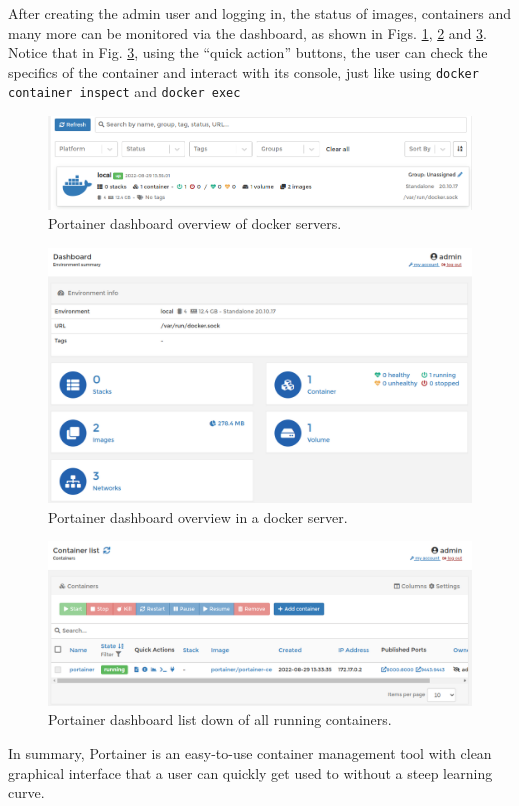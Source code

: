 After creating the admin user and logging in, the status of images, containers and many more can be monitored via the dashboard, as shown in Figs. \ref{ch:vac:fig:portainerdashboard1}, \ref{ch:vac:fig:portainerdashboard2} and \ref{ch:vac:fig:portainerdashboard3}. Notice that in Fig. \ref{ch:vac:fig:portainerdashboard3}, using the ``quick action'' buttons, the user can check the specifics of the container and interact with its console, just like using \verb|docker container inspect| and \verb|docker exec|
\begin{figure}[htbp]
	\centering
	\includegraphics[width=350pt]{chapters/part-3/figures/portainerdashboard1.png}
	\caption{Portainer dashboard overview of docker servers.} \label{ch:vac:fig:portainerdashboard1}
\end{figure}

\begin{figure}[htbp]
	\centering
	\includegraphics[width=350pt]{chapters/part-3/figures/portainerdashboard2.png}
	\caption{Portainer dashboard overview in a docker server.} \label{ch:vac:fig:portainerdashboard2}
\end{figure}

\begin{figure}[htbp]
	\centering
	\includegraphics[width=350pt]{chapters/part-3/figures/portainerdashboard3.png}
	\caption{Portainer dashboard list down of all running containers.} \label{ch:vac:fig:portainerdashboard3}
\end{figure}

In summary, Portainer is an easy-to-use container management tool with clean graphical interface that a user can quickly get used to without a steep learning curve.



